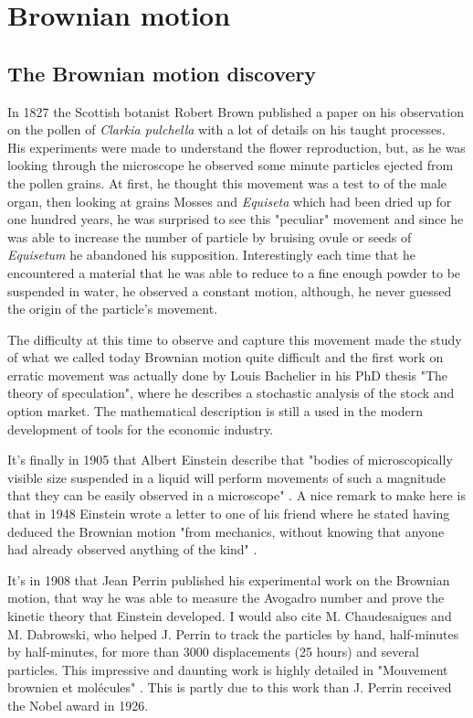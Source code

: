 \section{Brownian motion}
	\label{sec:chapter1}
	
\subsection{The Brownian motion discovery}

	
In 1827 the Scottish botanist Robert Brown published a paper \cite{robert_xxvii_1828} on his observation on the pollen of \textit{Clarkia pulchella} with a lot of details on his taught processes. His experiments were made to understand the flower reproduction, but, as he was looking through the microscope he observed some minute particles ejected from the pollen grains. At first, he thought this movement was a test to of the male organ, then looking at grains Mosses and \textit{Equiseta} which had been dried up for one hundred years, he was surprised to see this "peculiar" movement and since he was able to increase the number of particle by bruising ovule or seeds of \textit{Equisetum} he abandoned his supposition. Interestingly each time that he encountered a material that he was able to reduce to a fine enough powder to be suspended in water, he observed a constant motion, although, he never guessed the origin of the particle's movement.

The difficulty at this time to observe and capture this movement made the study of what we called today Brownian motion quite difficult and the first work on erratic movement was actually done by Louis Bachelier in his PhD thesis "The theory of speculation", where he describes a stochastic analysis of the stock and option market. The mathematical description is still a used in the modern development of tools for the economic industry. 

It's finally in 1905 that Albert Einstein describe that "bodies of microscopically visible size suspended in a liquid will perform movements of such a magnitude that they can be easily observed in a microscope" \cite{einstein_uber_1905}. A nice remark to make here is that in 1948 Einstein wrote a letter to one of his friend where he stated having deduced the Brownian motion "from mechanics, without knowing that anyone had already observed anything of the kind" \cite{peter_brownian_nodate}.

It's in 1908 that Jean Perrin published his experimental work on the Brownian motion, that way he was able to measure the Avogadro number and prove the kinetic theory that Einstein developed. I would also cite M. Chaudesaigues and M. Dabrowski, who helped J. Perrin to track the particles by hand, half-minutes by half-minutes, for more than 3000 displacements (25 hours) and several particles. This impressive and daunting work is highly detailed in "Mouvement brownien et molécules" \cite{perrin_mouvement_1910}. This is partly due to this work than J. Perrin received the Nobel award in 1926.

